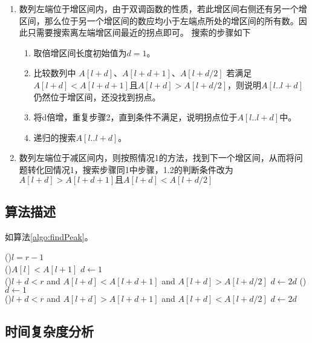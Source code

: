 \begin{enumerate}
    \item 数列左端位于增区间内，由于双调函数的性质，若此增区间右侧还有另一个增区间，那么位于另一个增区间的数应均小于左端点所处的增区间的所有数。因此只需要搜索离左端增区间最近的拐点即可。
    搜索的步骤如下\begin{enumerate}
        \item 取倍增区间长度初始值为$d = 1$。
        \item 比较数列中 $A[l + d]$、$A[l + d + 1]$、$A[l + d/2]$ 若满足$A[l + d] < A[l + d + 1] \text{且} A[l + d] > A[l + d/2]$，则说明$A[l..l+d]$仍然位于增区间，还没找到拐点。
        \item 将d倍增，重复步骤2，直到条件不满足，说明拐点位于$A[l..l+d]$中。
        \item 递归的搜索$A[l..l+d]$。
    \end{enumerate}
    \item 数列左端位于减区间内，则按照情况1的方法，找到下一个增区间，从而将问题转化回情况1，搜索步骤同1中步骤，1.2的判断条件改为$A[l + d] > A[l + d + 1] \text{且} A[l + d] < A[l + d/2]$
\end{enumerate}

\subsection*{算法描述}

如算法\ref{algo:findPeak}。\\

\begin{algorithm}[H]
    \caption{$findPeak(l, r)$}\label{algo:findPeak}
    \If(){$l=r-1$}{
        \\
    }
    \If(){$A[l] < A[l+1]$}{
        $d \leftarrow 1$\\
        \While(){$l+d < r $ and $A[l + d] < A[l + d + 1] $ and $ A[l + d] > A[l + d/2]$}{
            $d \leftarrow 2d$
        }
    }\Else(){
        $d \leftarrow 1$\\
        \While(){$l+d < r $ and $A[l + d] > A[l + d + 1] $ and $ A[l + d] < A[l + d/2]$}{
            $d \leftarrow 2d$
        }
    }
\end{algorithm}

\subsection*{时间复杂度分析}

